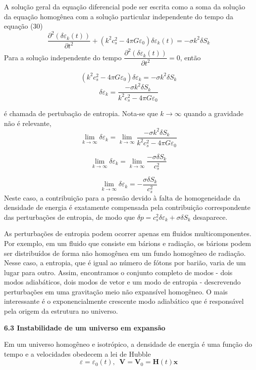 \documentclass[a4paper,12pt]{article}
\begin{document}
A solução geral da equação diferencial pode ser escrita como a soma da solução da equação homogênea com a solução particular independente do tempo da equação (30)
$$\dfrac{\partial^2 (\delta\varepsilon_k (t))}{\partial t^2} +(k^2c^2_s - 4\pi G\varepsilon_0)\delta\varepsilon_k (t) = -\sigma k^2 \delta S_k$$
Para a solução independente do tempo $\dfrac{\partial^2 (\delta\varepsilon_k (t))}{\partial t^2} = 0$, então

$$(k^2c^2_s - 4\pi G\varepsilon_0)\delta\varepsilon_k = -\sigma k^2 \delta S_k$$
\begin{equation}\label{eq31}
	\delta\varepsilon_k  = \dfrac{ -\sigma k^2 \delta S_k}{k^2c^2_s - 4\pi G\varepsilon_0}
\end{equation}

é chamada de pertubação de entropia. Nota-se que $k \to \infty$ quando a gravidade não é relevante, 
$$\lim_{k \to\infty}\delta\varepsilon_k = \lim_{k \to\infty}\dfrac{ -\sigma k^2 \delta S_k}{k^2c^2_s - 4\pi G\varepsilon_0}$$

$$\lim_{k \to\infty}\delta\varepsilon_k = \lim_{k \to\infty}\dfrac{ -\sigma \delta S_k}{c^2_s}$$

$$\lim_{k \to\infty}\delta\varepsilon_k =-\dfrac{ \sigma \delta S_k}{c^2_s}$$
Neste caso, a contribuição para a pressão devido à falta de homogeneidade da densidade de energia é exatamente compensada pela contribuição correspondente das perturbações de entropia, de modo que $\delta p = c_s^2 \delta\varepsilon_k + \sigma\delta S_k$ desaparece. 

As perturbações de entropia podem ocorrer apenas em fluidos multicomponentes. Por exemplo, em um fluido que consiste em bárions e radiação, os bárions podem ser distribuídos de forma não homogênea em um fundo homogêneo de radiação. Nesse caso, a entropia, que é igual ao número de fótons por barião, varia de um lugar para outro.
Assim, encontramos o conjunto completo de modos - dois modos adiabáticos, dois
modos de vetor e um modo de entropia - descrevendo perturbações em uma gravitação
meio não expansível homogêneo. O mais interessante é o exponencialmente
crescente modo adiabático que é responsável pela origem da estrutura no
universo.

\begin{center}
	\textbf{6.3 Instabilidade de um universo em expansão}
\end{center}

Em um universo homogêneo e isotrópico, a densidade de energia é uma função do tempo e a velocidades obedecem a lei de Hubble
\begin{equation}\label{eq32}
	\varepsilon = \varepsilon_0 (t), \,\,\, \mathbf{V} = \mathbf{V}_0 = \mathbf{H} (t) \mathbf{x}
\end{equation}
\end{document}
